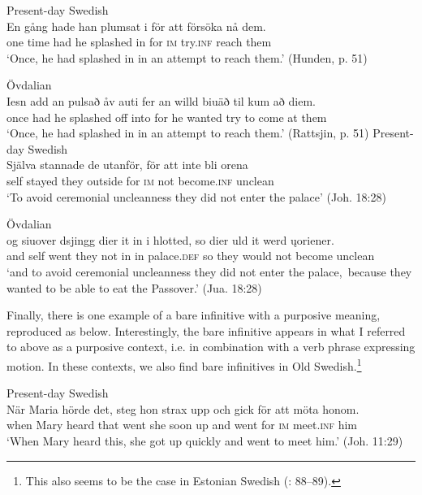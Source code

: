 \documentclass[output=paper]{langscibook}
\begin{document}
\ea
\label{ex:kalm:20}
\ea Present-day Swedish\label{ex:kalm:20a}\\
\gll En gång hade han plumsat i för att försöka nå dem.\\
one time had he splashed in for \textsc{im} try.\textsc{inf} reach them\\ 
\glt ‘Once, he had splashed in in an attempt to reach them.’ (Hunden, p. 51)

\ex Övdalian\label{ex:kalm:20b}\\
\gll Iesn add an pulsað åv auti fer an willd biuäð til kum að diem.\\
once had he splashed off into for he wanted try to come at them\\
\glt ‘Once, he had splashed in in an attempt to reach them.’ (Rattsjin, p. 51)
\z 
\ex
\label{ex:kalm:21}
\ea Present-day Swedish\label{ex:kalm:21a}\\ 
\gll Själva stannade de utanför, för att inte bli orena\\
self stayed they outside for \textsc{im} not become.\textsc{inf} unclean\\
\glt ‘To avoid ceremonial uncleanness they did not enter the palace’ (Joh. 18:28)

\ex Övdalian\label{ex:kalm:21b}\\
\gll og siuover dsjingg dier it in i hlotted, so dier uld it werd \k{u}oriener.\\
and self went they not in in palace.\textsc{def} so they would not become unclean\\
\glt ‘and to avoid ceremonial uncleanness they did not enter the palace,{~}because they wanted to be able to eat the Passover.’ (Jua. 18:28)
\z 
\z\largerpage[2]


Finally, there is one example of a bare infinitive with a purposive meaning, reproduced as  below. Interestingly, the bare infinitive appears in what I referred to above as a purposive context, i.e. in combination with a verb phrase expressing motion. In these contexts, we also find bare infinitives in Old Swedish.\footnote{This also seems to be the case in Estonian Swedish (\citealt{Lagman1958}: 88–89).} 


\ea
\label{ex:kalm:22}
\ea Present-day Swedish\label{ex:kalm:22a}\\
\gll När Maria hörde det, steg hon strax upp och gick för att möta honom.\\
when Mary heard that went she soon up and went for \textsc{im} meet.\textsc{inf} him\\
\glt ‘When Mary heard this, she got up quickly and went to meet him.’ (Joh. 11:29)
\end{document}
